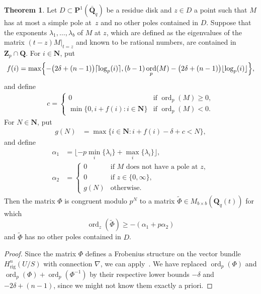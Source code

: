 \documentclass[a4paper,11pt]{article}
\numberwithin{equation}{section}
\newcommand{\NN}{\mathbf{N}} %
\newcommand{\ZZ}{\mathbf{Z}} %
\newcommand{\QQ}{\mathbf{Q}} %
\DeclareMathOperator{\ord}{ord}          %
\providecommand{\Hrig}{H_{\text{rig}}}  %
\theoremstyle{definition}
\newtheorem{thm}{Theorem}[section]
\begin{document}
\begin{thm} \label{thm:KedlayaTuitman}
Let $D \subset \mathbf{P}^1(\bar{\QQ}_q)$ be a residue disk and
$z \in D$ a point such that $M$ has at most a simple pole at~$z$ 
and no other poles contained in $D$. Suppose that 
the exponents $\lambda_1, \dotsc, \lambda_{b}$ of $M$ at $z$, which are defined 
as the eigenvalues  of the matrix $(t - z) M \vert_{t=z}$ and 
known to be rational numbers, are contained in $\ZZ_p \cap \QQ$. 
For $i \in \NN$, put
\begin{align*}
f(i) = \max \Bigl\{ -\bigl(2 \delta + (n-1) \bigr) \lceil \log_p(i) \rceil, 
(b-1) \ord_p(M) -\bigl(2 \delta + (n-1) \bigr) \lfloor \log_p(i) \rfloor 
\Bigr\},
\end{align*}
and define 
\begin{align*}
c = \begin{cases}
0 & \mbox{if $\ord_p(M) \geq 0$}, \\
\min\{0, i + f(i): i \in \NN\} & \mbox{if $\ord_p(M) < 0$}.
\end{cases}
\end{align*}
For $N \in \NN$, put
\begin{align*}
g(N) &= \max \{i \in \NN : i + f(i) - \delta + c  < N \},
\end{align*}
and define
\begin{align*}
\alpha_1    &= \lfloor -p \min_i \{ \lambda_i \} + \max_{i} \{\lambda_i\} \rfloor, \\ 
\alpha_2    &=  \left \{ 
         \begin{array}{cl}
         0  & \mbox{if $M$ does not have a pole at $z$},  \\
         0  & \mbox{if $z \in \{0,\infty \}$}, \\
         g(N) & \mbox{otherwise}.
         \end{array}
         \right.
\end{align*}
Then the matrix $\Phi$ is congruent 
modulo $p^{N}$ to a matrix $\tilde{\Phi} \in M_{b \times b}(\QQ_q(t))$ for which
\begin{equation*}
\ord_z(\tilde{\Phi}) \geq -(\alpha_1+p \alpha_2)
\end{equation*}
and $\tilde{\Phi}$ has no other poles contained in $D$.
\end{thm}

\begin{proof}
Since the matrix $\Phi$ defines a Frobenius structure on the vector 
bundle $\Hrig^n(U/S)$ with connection $\nabla$, we can 
apply~\citep[Theorem~2.1]{KedlayaTuitman2012}. We have 
replaced $\ord_p(\Phi)$ and $\ord_p(\Phi)+\ord_p(\Phi^{-1})$ 
by their respective lower bounds $-\delta$ and $-2 \delta + (n-1)$, since 
we might not know them exactly a priori.
\end{proof}
\end{document}
